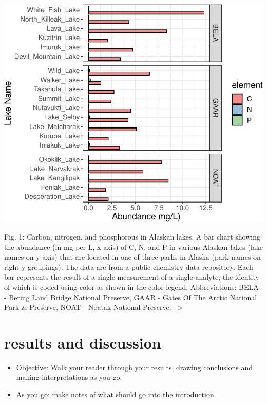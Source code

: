 \documentclass[
]{krantz}
\providecommand{\tightlist}{%
  \setlength{\itemsep}{0pt}\setlength{\parskip}{0pt}}
\begin{document}
\begin{center}\includegraphics[width=1\linewidth]{index_files/figure-latex/unnamed-chunk-177-1} \end{center}

Fig. 1: Carbon, nitrogen, and phosphorous in Alaskan lakes. A bar chart showing the abundance (in mg per L, x-axis) of C, N, and P in various Alaskan lakes (lake names on y-axis) that are located in one of three parks in Alaska (park names on right y groupings). The data are from a public chemistry data repository. Each bar represents the result of a single measurement of a single analyte, the identity of which is coded using color as shown in the color legend. Abbreviations: BELA - Bering Land Bridge National Preserve, GAAR - Gates Of The Arctic National Park \& Preserve, NOAT - Noatak National Preserve. --\textgreater{}

\hypertarget{results-and-discussion}{%
\section{results and discussion}\label{results-and-discussion}}

\begin{itemize}
\tightlist
\item
  Objective: Walk your reader through your results, drawing conclusions and making interpretations as you go.
\end{itemize}

\begin{itemize}
\tightlist
\item
  As you go: make notes of what should go into the introduction.
\end{itemize}
\end{document}
